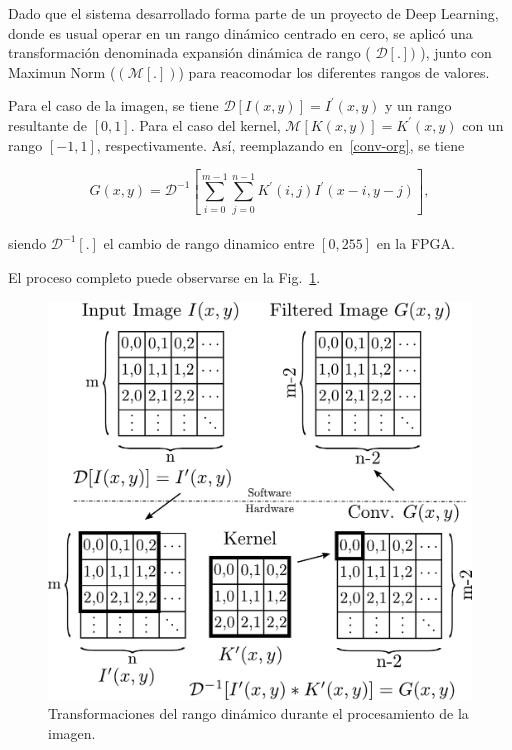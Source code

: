\documentclass[]{IEEEphot}
\begin{document}
Dado que el sistema desarrollado forma parte de un proyecto de Deep Learning, donde es usual operar en un rango dinámico centrado en cero, se aplicó una transformación denominada  expansión dinámica de rango ( $\mathcal{D}[.])$ ),
junto con Maximun Norm ($(\mathcal{M}[.])$) para reacomodar los diferentes rangos de valores.

Para el caso de la imagen, se tiene $\mathcal{D}[I(x,y)]=I^\prime(x,y)$ y un rango resultante de $[0,1]$.
Para el caso del kernel, $\mathcal{M}[K(x,y)]=K^\prime(x,y)$ con un rango $[-1,1]$, respectivamente.
Así, reemplazando en~\ref{conv-org}, se tiene 

\begin{equation}\label{conv-org1}
  G(x,y) = \mathcal{D}^{-1}\left[\sum_{i=0}^{m-1} \sum_{j=0}^{n-1}K^\prime(i,j)I^\prime(x-i,y-j)\right],
\end{equation}\\
siendo $\mathcal{D}^{-1}[.]$ el cambio de rango dinamico entre $[0,255]$ en la FPGA.

El proceso completo puede observarse en la Fig.~\ref{transformation}.

\begin{figure}
\centering
\includegraphics[scale=0.47]{wflow3}
\caption{Transformaciones del rango dinámico durante el procesamiento de la imagen.}
\label{transformation}
\end{figure}
\end{document}
